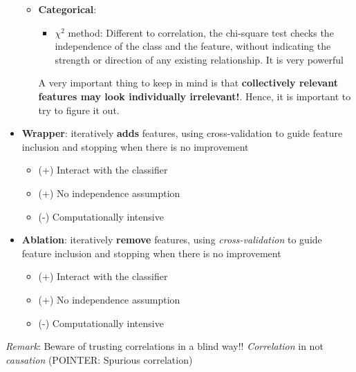 \begin{itemize}
\begin{itemize}

\item \textbf{Categorical}: 
\begin{itemize}
\item $\chi^2$ method: Different to correlation, the chi-square test checks the independence of the class and the feature, without indicating the strength or direction of any existing relationship. It is very powerful
\end{itemize}

A very important thing to keep in mind is that \textbf{collectively relevant features may look individually irrelevant!}. Hence, it is important to try to figure it out.
\end{itemize}

\item \textbf{Wrapper}: iteratively \textbf{adds} features, using cross-validation to guide feature inclusion and stopping when there is no improvement

\begin{itemize}
\item (+) Interact with the classifier
\item (+) No independence assumption
\item (-) Computationally intensive
\end{itemize}

\item \textbf{Ablation}: iteratively \textbf{remove} features, using \emph{cross-validation} to guide feature inclusion and stopping when there is no improvement

\begin{itemize}
\item (+) Interact with the classifier
\item (+) No independence assumption
\item (-) Computationally intensive
\end{itemize}

\end{itemize}

\emph{Remark}: Beware of trusting correlations in a blind way!! \emph{Correlation} in not \emph{causation} (POINTER: Spurious correlation)

